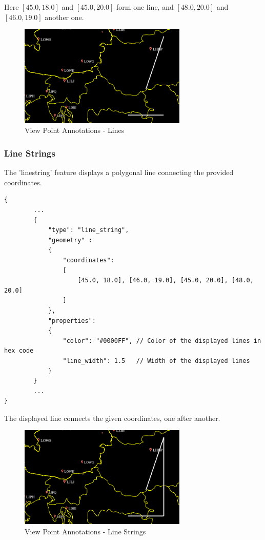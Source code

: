 Here $[45.0, 18.0]$ and $[45.0, 20.0]$ form one line, and $[48.0, 20.0]$ and $[46.0, 19.0]$ another one.

\begin{figure}[H]
    \center
        \includegraphics[width=8cm]{figures/viewpoints_anno_example_lines.png}
    \caption{View Point Annotations - Lines} 
\end{figure}

\subsubsection{Line Strings} The 'line\textunderscore string' feature displays a polygonal line connecting the provided coordinates.

\begin{lstlisting}[basicstyle=\small\ttfamily]
{
        ...
        {
            "type": "line_string",
            "geometry" :
            {
                "coordinates": 
                [
                    [45.0, 18.0], [46.0, 19.0], [45.0, 20.0], [48.0, 20.0]
                ]
            },
            "properties":
            {
                "color": "#0000FF", // Color of the displayed lines in hex code
                "line_width": 1.5   // Width of the displayed lines
            }
        }
        ...
}
\end{lstlisting}

The displayed line connects the given coordinates, one after another.

\begin{figure}[H]
    \center
        \includegraphics[width=8cm]{figures/viewpoints_anno_example_linestring.png}
    \caption{View Point Annotations - Line Strings} 
\end{figure}

